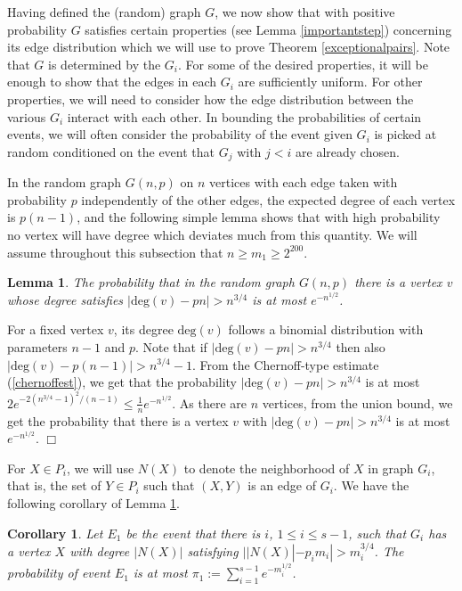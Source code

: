 \documentclass[11pt]{article}
\newtheorem{lemma}{Lemma}[section]
\newtheorem{corollary}{Corollary}[section]
\newenvironment{proof}
      {\medskip\noindent{\bf Proof:}\hspace{1mm}}
      {\hfill$\Box$\medskip}
\begin{document}
Having defined the (random) graph $G$, we now show that with positive
probability $G$ satisfies certain properties (see Lemma \ref{importantstep})
concerning its edge distribution which we will use to prove Theorem
\ref{exceptionalpairs}. Note that $G$ is determined by the $G_i$. For some of
the desired properties, it will be enough to show that the edges in each $G_i$
are sufficiently uniform. For other properties, we will need to consider how
the edge distribution between the various $G_i$ interact with each other. In
bounding the probabilities of certain events, we will often consider the
probability of the event given $G_i$ is picked at random conditioned on the event that
$G_j$ with $j<i$ are already chosen.

In the random graph $G(n,p)$ on $n$ vertices with each
edge taken with probability $p$ independently of the other edges, the expected
degree of each vertex is $p(n-1)$, and the following simple lemma shows that
with high probability no vertex will have degree which deviates much from this
quantity. We will assume throughout this subsection that $n \geq m_1 \geq
2^{200}$.

\begin{lemma}\label{commonneighbors}
The probability that in the random graph $G(n,p)$ there is a
vertex $v$ whose degree satisfies $|\textrm{deg}(v)-pn| > n^{3/4}$ is at most
$e^{-n^{1/2}}$.
\end{lemma}
\begin{proof}
For a fixed vertex $v$, its degree $\textrm{deg}(v)$ follows a binomial
distribution with parameters $n-1$ and $p$. Note that if $|\textrm{deg}(v)-pn|
> n^{3/4}$ then also $|\textrm{deg}(v)-p(n-1)| > n^{3/4}-1$.
From the Chernoff-type estimate (\ref{chernoffest}), we get that the
probability $|\textrm{deg}(v)-pn| > n^{3/4}$ is at most
$2e^{-2(n^{3/4}-1)^2/(n-1)}
\leq \frac{1}{n}e^{-n^{1/2}}$. As there are $n$ vertices, from the union bound,
we get the
probability that there is a vertex $v$ with $|\textrm{deg}(v)-pn| > n^{3/4}$ is at
most $e^{-n^{1/2}}$.
\end{proof}

For $X \in P_i$, we will use $N(X)$ to denote the neighborhood of $X$ in graph
$G_i$, that is, the set of $Y \in P_i$ such that $(X,Y)$ is an edge of $G_i$.
We have the following corollary of Lemma \ref{commonneighbors}.

\begin{corollary}\label{commonneighborscor}
Let $E_1$ be the event that there is $i$, $1 \leq i \leq s-1$, such that $G_i$
has a vertex $X$ with degree $|N(X)|$ satisfying $||N(X)|-p_im_i|>m_i^{3/4}$.
The probability of event $E_1$ is at most $\pi_1:=\sum_{i=1}^{s-1}
e^{-m_i^{1/2}}$.
\end{corollary}
\end{document}
